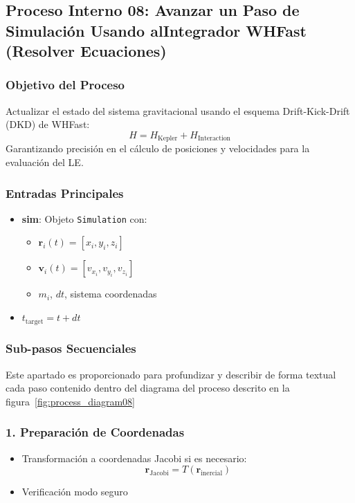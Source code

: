 \subsection[Proceso Interno 08: Resolver Ecuaciones]{Proceso Interno 08: Avanzar un Paso de Simulación Usando alIntegrador WHFast (Resolver Ecuaciones)}

\subsubsection{Objetivo del Proceso}
Actualizar el estado del sistema gravitacional usando el esquema Drift-Kick-Drift (DKD) de WHFast:
\[
H = H_{\text{Kepler}} + H_{\text{Interaction}}
\]
Garantizando precisión en el cálculo de posiciones y velocidades para la evaluación del LE.\

\subsubsection{Entradas Principales}
\begin{itemize}
    \item \textbf{sim}: Objeto \texttt{Simulation} con:
    \begin{itemize}
        \item $\mathbf{r}_i(t) = [x_i, y_i, z_i]$
        \item $\mathbf{v}_i(t) = [v_{x_i}, v_{y_i}, v_{z_i}]$
        \item $m_i$, $dt$, sistema coordenadas
    \end{itemize}
    \item $t_{\text{target}} = t + dt$
\end{itemize}

\subsubsection{Sub-pasos Secuenciales}
Este apartado es proporcionado para profundizar y describir de forma textual cada paso contenido dentro del diagrama del proceso descrito en la figura~\ref{fig:process_diagram08}
\subsubsection*{1. Preparación de Coordenadas}
\begin{itemize}
    \item Transformación a coordenadas Jacobi si es necesario:
    \[
    \mathbf{r}_{\text{Jacobi}} = T(\mathbf{r}_{\text{inercial}})
    \]
    \item Verificación modo seguro
\end{itemize}

